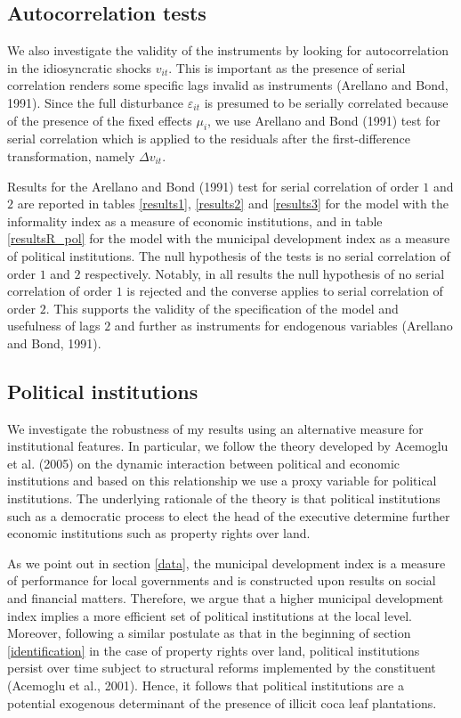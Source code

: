 \documentclass[12pt,a4paper,english]{article}%
\begin{document}
\subsection{Autocorrelation tests}
\label{auto}

We also investigate the validity of the instruments by looking for  autocorrelation in the idiosyncratic shocks $v_{it}$. This is important as the presence of serial correlation renders some specific lags invalid as instruments (Arellano and Bond, 1991). Since the full disturbance $\varepsilon_{it}$ is presumed to be serially correlated because of the presence of the fixed effects $\mu_{i}$, we use Arellano and Bond (1991) test for serial correlation which is applied to the residuals after the first-difference transformation, namely $\Delta v_{it}$.

Results for the Arellano and Bond (1991) test for serial correlation of order $1$ and $2$ are reported in tables \ref{results1}, \ref{results2} and \ref{results3} for the model with the informality index as a measure of economic institutions, and in table \ref{resultsR_pol} for the model with the municipal development index as a measure of political institutions. The null hypothesis of the tests is no serial correlation of order $1$ and $2$ respectively. Notably, in all results the null hypothesis of no serial correlation of order $1$ is rejected and the converse applies to serial correlation of order $2$. This supports the validity of the specification of the model and usefulness of lags $2$ and further as instruments for endogenous variables (Arellano and Bond, 1991).

\subsection{Political institutions}

We investigate the robustness of my results using an alternative measure for institutional features. In particular, we follow the theory developed by Acemoglu et al. (2005) on the dynamic interaction between political and economic institutions and based on this relationship we use a proxy variable for political institutions. The underlying rationale of the theory is that political institutions such as a democratic process to elect the head of the executive determine further economic institutions such as property rights over land.

As we point out in section \ref{data}, the municipal development index is a measure of performance for local governments and is constructed upon results on social and financial matters. Therefore, we argue that a higher municipal development index implies a more efficient set of political institutions at the local level. Moreover, following a similar postulate as that in the beginning of section \ref{identification} in the case of property rights over land, political institutions persist over time subject to structural reforms implemented by the constituent (Acemoglu et al., 2001). Hence, it follows that political institutions are a potential exogenous determinant of the presence of illicit coca leaf plantations.
\end{document}
